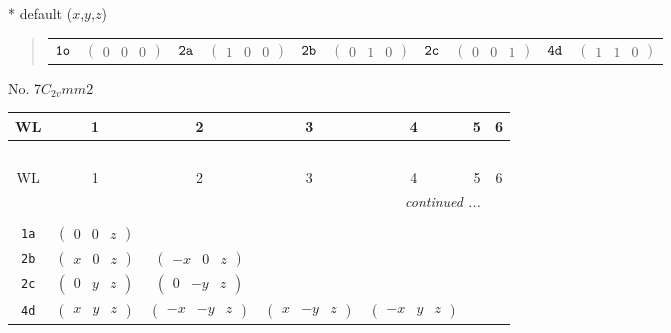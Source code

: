 \documentclass[fleqn,9pt,landscape]{jsarticle}
\begin{document}
* default ($x$,$y$,$z$)
\begin{quote}
\begin{tabular}{cccccccccc}
$ {\tt 1o} $ & $ \begin{pmatrix} 0 & 0 & 0 \end{pmatrix} $ & $ {\tt 2a} $ & $ \begin{pmatrix} 1 & 0 & 0 \end{pmatrix} $ & $ {\tt 2b} $ & $ \begin{pmatrix} 0 & 1 & 0 \end{pmatrix} $ & $ {\tt 2c} $ & $ \begin{pmatrix} 0 & 0 & 1 \end{pmatrix} $ & $ {\tt 4d} $ & $ \begin{pmatrix} 1 & 1 & 0 \end{pmatrix} $
\end{tabular}
\end{quote}
\newpage
No. 7\quad$C_{2v}$\quad$mm2$\quad[ orthorhombic ]
\begin{center}
\renewcommand{\arraystretch}{1.2}
\begin{longtable}{ccccccc}
 \hline \hline
WL & 1 & 2 & 3 & 4 & 5 & 6 \\ \hline \endfirsthead

\multicolumn{6}{l}{\tablename\ \thetable{}} \\
 \hline \hline
WL & 1 & 2 & 3 & 4 & 5 & 6 \\ \hline \endhead

 \hline \hline
\multicolumn{6}{r}{\footnotesize\it continued ...} \\ \endfoot

 \hline \hline
\multicolumn{6}{r}{} \\ \endlastfoot

{\tt 1a} & $ \begin{pmatrix} 0 & 0 & z \end{pmatrix} $ & $  $ & $  $ & $  $ \\ \hline
{\tt 2b} & $ \begin{pmatrix} x & 0 & z \end{pmatrix} $ & $ \begin{pmatrix} - x & 0 & z \end{pmatrix} $ & $  $ & $  $ \\ \hline
{\tt 2c} & $ \begin{pmatrix} 0 & y & z \end{pmatrix} $ & $ \begin{pmatrix} 0 & - y & z \end{pmatrix} $ & $  $ & $  $ \\ \hline
{\tt 4d} & $ \begin{pmatrix} x & y & z \end{pmatrix} $ & $ \begin{pmatrix} - x & - y & z \end{pmatrix} $ & $ \begin{pmatrix} x & - y & z \end{pmatrix} $ & $ \begin{pmatrix} - x & y & z \end{pmatrix} $ \\
\end{longtable}
\end{center}
\end{document}
